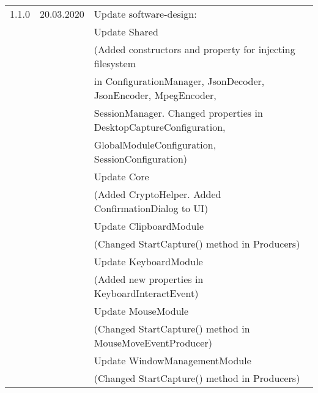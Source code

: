 \newpage
\begin{table}[h]
\begin{tabular}{lll}
\hline
1.1.0			  & 20.03.2020	  & Update software-design:\\
&& Update Shared\\
&& (Added constructors and property for injecting filesystem\\
&& in ConfigurationManager, JsonDecoder, JsonEncoder, MpegEncoder, \\ 
&& SessionManager. Changed properties in DesktopCaptureConfiguration,\\
&& GlobalModuleConfiguration, SessionConfiguration)\\
&& Update Core\\
&& (Added CryptoHelper. Added ConfirmationDialog to UI)\\
&& Update ClipboardModule\\
&& (Changed StartCapture() method in Producers)\\
&& Update KeyboardModule\\
&& (Added new properties in KeyboardInteractEvent)\\
&& Update MouseModule\\
&& (Changed StartCapture() method in MouseMoveEventProducer)\\
&& Update WindowManagementModule\\
&& (Changed StartCapture() method in Producers)\\
\end{tabular}
\end{table}